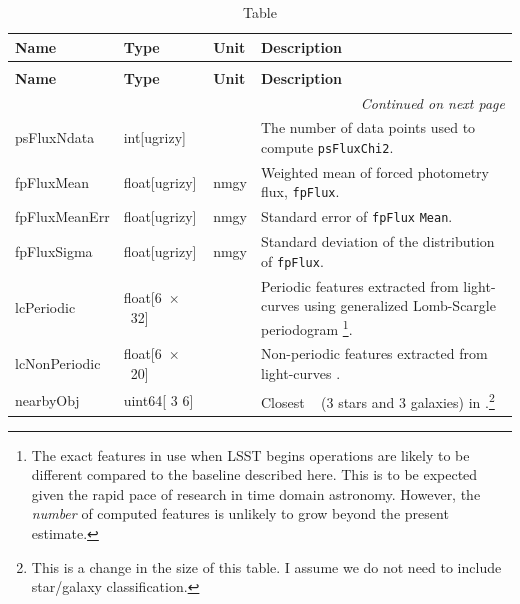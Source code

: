 \documentclass[SE,lsstdraft,toc]{lsstdoc}
\newcommand\x         {\hbox{$\times$}}
\newcommand{\oldtext}[1]{{\color{red} #1}}
\newcommand{\newtext}[1]{{\color{blue} #1}}
\newenvironment{schema}[3]{%
\setlength\LTleft{0pt}
\setlength\LTright{\fill}
\begin{longtable}{p{0.2\textwidth}p{0.14\textwidth}p{0.14\textwidth}p{0.41\textwidth}}

\caption[#1]{#2\label{#3}}\\

\hline \textbf{Name} & \textbf{Type} & \textbf{Unit} & \textbf{Description}\\ \hline
\endfirsthead

\caption[#1]{#2}\\

\hline \textbf{Name} & \textbf{Type} & \textbf{Unit} & \textbf{Description}\\ \hline
\endhead

\hline \multicolumn{4}{r}{\emph{Continued on next page}} \\
\endfoot

\hline\hline
\endlastfoot
}{%
\hline
\end{longtable}
}
\begin{document}
\begin{schema}{\DIAObject Table}{\DIAObject Table}{tbl:diaobjectTable}
psFluxNdata & int[ugrizy] & ~ & The number of data points used to compute \texttt{psFluxChi2}. \\

fpFluxMean & float[ugrizy] & nmgy & Weighted mean of forced photometry flux, \texttt{fpFlux}.\\

fpFluxMeanErr & float[ugrizy] & nmgy & Standard error of \texttt{fpFlux}\newtext{\texttt{Mean}}. \\

fpFluxSigma & float[ugrizy] & nmgy & Standard deviation of the distribution of \texttt{fpFlux}. \\





lcPeriodic & float[6~\x~32] & ~ & Periodic features extracted from light-curves using generalized Lomb-Scargle periodogram \citep[Table~4,][]{2011ApJ...733...10R}\footnote{The exact features in use when LSST begins operations are likely to be different compared to the baseline described here. This is to be expected given the rapid pace of research in time domain astronomy. However, the \emph{number} of computed features is unlikely to grow beyond the present estimate.}. \\

lcNonPeriodic & float[6~\x~20] & ~ & Non-periodic features extracted from light-curves \citep[Table~5,][]{2011ApJ...733...10R}. \\

nearbyObj   & uint64[\oldtext{3}\newtext{6}] & ~ & Closest \Objects\ \newtext{(3 stars and 3 galaxies)} in \DR.\footnote{\color{magenta} This is a change in the size of this table. I assume we do not need to include star/galaxy classification.} \\


\end{schema}
\end{document}
